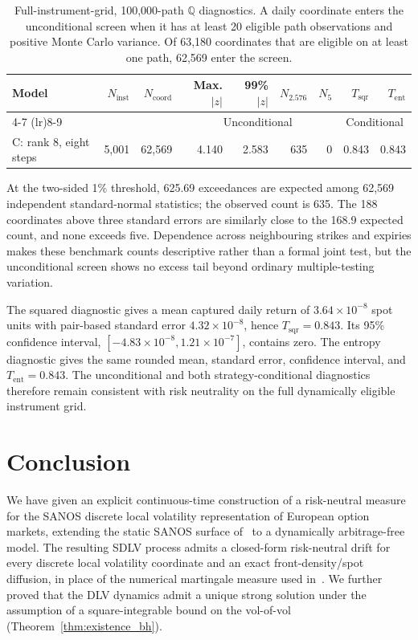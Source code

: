 \documentclass[11pt]{article}
\newcommand{\Q}{\mathbb Q}
\newcommand{\abs}[1]{\lvert #1\rvert}
\theoremstyle{plain}
\theoremstyle{definition}
\theoremstyle{remark}
\begin{document}
\begin{table}[H]
\centering
\small
\begin{tabular}{lrrrrrrrr}
\toprule
Model & $N_{\mathrm{inst}}$ & $N_{\mathrm{coord}}$
  & Max. $\abs{z}$ & 99\% $\abs{z}$
  & $N_{2.576}$ & $N_5$ & $T_{\mathrm{sqr}}$ & $T_{\mathrm{ent}}$\\
\cmidrule(lr){4-7}
\cmidrule(lr){8-9}
 & & & \multicolumn{4}{c}{Unconditional} & \multicolumn{2}{c}{Conditional}\\
\midrule
C: rank 8, eight steps
  & 5,001 & 62,569 & {\color{orange}4.140} & 2.583 & 635 & 0 & 0.843 & 0.843\\
\bottomrule
\end{tabular}
\caption{Full-instrument-grid, 100,000-path $\Q$ diagnostics.  A daily
coordinate enters the unconditional screen when it has at least 20 eligible
path observations and positive Monte Carlo variance.  Of 63,180 coordinates
that are eligible on at least one path, 62,569 enter the screen.}
\label{tab:numerics-full-instrument-grid}
\end{table}

At the two-sided 1\% threshold, 625.69 exceedances are expected among 62,569
independent standard-normal statistics; the observed count is 635.  The 188
coordinates above three standard errors are similarly close to the 168.9
expected count, and none exceeds five.  Dependence across neighbouring strikes
and expiries makes these benchmark counts descriptive rather than a formal
joint test, but the unconditional screen shows no excess tail beyond ordinary
multiple-testing variation.

The squared diagnostic gives a mean captured daily return of
$3.64\times10^{-8}$ spot units with pair-based standard error
$4.32\times10^{-8}$, hence $T_{\mathrm{sqr}}=0.843$.  Its 95\% confidence
interval, $[-4.83\times10^{-8},1.21\times10^{-7}]$, contains zero.  The entropy
diagnostic gives the same rounded mean, standard error, confidence interval,
and $T_{\mathrm{ent}}=0.843$.  The unconditional and both
strategy-conditional diagnostics therefore remain consistent with risk
neutrality on the full dynamically eligible instrument grid.

\section{Conclusion}

We have given an explicit continuous-time construction of a risk-neutral measure for the SANOS
discrete local volatility representation of European option markets, extending the static
SANOS surface of~\cite{SANOS2026} to a dynamically arbitrage-free model. The resulting SDLV
process admits a closed-form risk-neutral drift for every discrete local volatility coordinate
and an exact front-density/spot diffusion, in place of the numerical martingale measure
used in~\cite{DYSANOS2026}. We further proved that the DLV dynamics admit a unique strong solution under the assumption of a square-integrable bound on the vol-of-vol (Theorem~\ref{thm:existence_bh}). 
\end{document}
